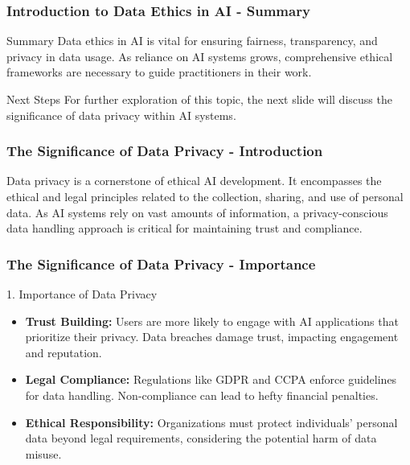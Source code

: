\documentclass[aspectratio=169]{beamer}
\begin{document}
\begin{frame}[fragile]
    \frametitle{Introduction to Data Ethics in AI - Summary}
    \begin{block}{Summary}
        Data ethics in AI is vital for ensuring fairness, transparency, and privacy in data usage. 
        As reliance on AI systems grows, comprehensive ethical frameworks are necessary to guide practitioners in their work.
    \end{block}
    
    \begin{block}{Next Steps}
        For further exploration of this topic, the next slide will discuss the significance of data privacy within AI systems.
    \end{block}
\end{frame}

\begin{frame}[fragile]
    \frametitle{The Significance of Data Privacy - Introduction}
    Data privacy is a cornerstone of ethical AI development. It encompasses the ethical and legal principles related to the collection, sharing, and use of personal data. As AI systems rely on vast amounts of information, a privacy-conscious data handling approach is critical for maintaining trust and compliance.
\end{frame}

\begin{frame}[fragile]
    \frametitle{The Significance of Data Privacy - Importance}
    \begin{block}{1. Importance of Data Privacy}
        \begin{itemize}
            \item \textbf{Trust Building:} 
            Users are more likely to engage with AI applications that prioritize their privacy. Data breaches damage trust, impacting engagement and reputation.
            
            \item \textbf{Legal Compliance:} 
            Regulations like GDPR and CCPA enforce guidelines for data handling. Non-compliance can lead to hefty financial penalties.
            
            \item \textbf{Ethical Responsibility:} 
            Organizations must protect individuals' personal data beyond legal requirements, considering the potential harm of data misuse.
        \end{itemize}
    \end{block}
\end{frame}
\end{document}

